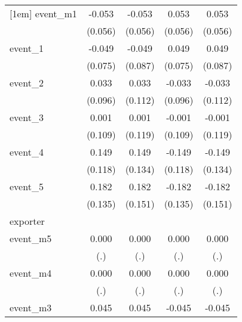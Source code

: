 {\begin{tabular}{l*{4}{c}}
[1em]
event\_m1    &      -0.053         &      -0.053         &       0.053         &       0.053         \\
            &     (0.056)         &     (0.056)         &     (0.056)         &     (0.056)         \\
[1em]
event\_1     &      -0.049         &      -0.049         &       0.049         &       0.049         \\
            &     (0.075)         &     (0.087)         &     (0.075)         &     (0.087)         \\
[1em]
event\_2     &       0.033         &       0.033         &      -0.033         &      -0.033         \\
            &     (0.096)         &     (0.112)         &     (0.096)         &     (0.112)         \\
[1em]
event\_3     &       0.001         &       0.001         &      -0.001         &      -0.001         \\
            &     (0.109)         &     (0.119)         &     (0.109)         &     (0.119)         \\
[1em]
event\_4     &       0.149         &       0.149         &      -0.149         &      -0.149         \\
            &     (0.118)         &     (0.134)         &     (0.118)         &     (0.134)         \\
[1em]
event\_5     &       0.182         &       0.182         &      -0.182         &      -0.182         \\
            &     (0.135)         &     (0.151)         &     (0.135)         &     (0.151)         \\
\hline
exporter    &                     &                     &                     &                     \\
event\_m5    &       0.000         &       0.000         &       0.000         &       0.000         \\
            &         (.)         &         (.)         &         (.)         &         (.)         \\
[1em]
event\_m4    &       0.000         &       0.000         &       0.000         &       0.000         \\
            &         (.)         &         (.)         &         (.)         &         (.)         \\
[1em]
event\_m3    &       0.045         &       0.045         &      -0.045         &      -0.045         \\

\end{tabular}}
